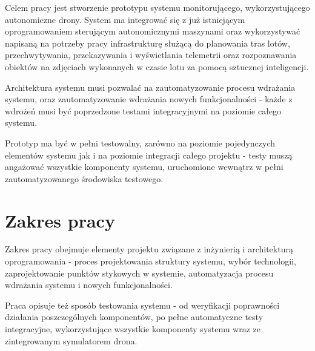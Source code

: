 Celem pracy jest stworzenie prototypu systemu monitorującego, wykorzystującego
autonomiczne drony. System ma integrować się z już istniejącym oprogramowaniem
sterującym autonomicznymi maszynami oraz wykorzystywać napisaną na potrzeby pracy
infrastrukturę służącą do planowania tras lotów, przechwytywania, przekazywania
i wyświetlania telemetrii oraz rozpoznawania obiektów na zdjęciach wykonanych
w czasie lotu za pomocą sztucznej inteligencji.

Architektura systemu musi pozwalać na zautomatyzowanie procesu wdrażania
systemu, oraz zautomatyzowanie wdrażania nowych funkcjonalności - każde
z wdrożeń musi być poprzedzone testami integracyjnymi na poziomie całego systemu. 

Prototyp ma być w pełni testowalny, zarówno na poziomie pojedynczych
elementów systemu jak i na poziomie integracji całego projektu - testy muszą
angażować wszystkie komponenty systemu, uruchomione wewnątrz w pełni
zautomatyzowanego środowiska testowego.

\section{Zakres pracy}

Zakres pracy obejmuje elementy projektu związane z
inżynierią i architekturą oprogramowania - proces projektowania struktury systemu,
wybór technologii, zaprojektowanie punktów stykowych w systemie, automatyzacja
procesu wdrażania systemu i nowych funkcjonalności.

Praca opisuje też sposób testowania systemu - od weryfikacji poprawności działania poszczególnych
komponentów, po pełne automatyczne testy integracyjne, wykorzystujące wszystkie
komponenty systemu wraz ze zintegrowanym symulatorem drona. 
